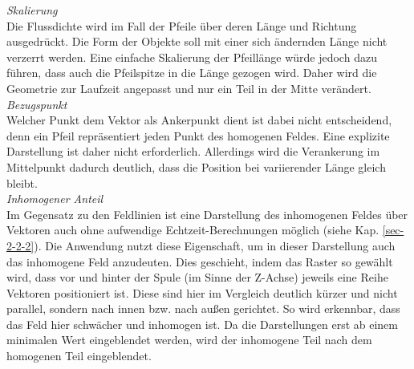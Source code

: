 \textit{Skalierung}\\
Die Flussdichte wird im Fall der Pfeile über deren Länge und Richtung ausgedrückt. Die Form der Objekte soll mit einer sich ändernden Länge nicht verzerrt werden. Eine einfache Skalierung der Pfeillänge würde jedoch dazu führen, dass auch die Pfeilspitze in die Länge gezogen wird. Daher wird die Geometrie zur Laufzeit angepasst und nur ein Teil in der Mitte verändert.\\

\textit{Bezugspunkt}\\
Welcher Punkt dem Vektor als Ankerpunkt dient ist dabei nicht entscheidend, denn ein Pfeil repräsentiert jeden Punkt des homogenen Feldes. Eine explizite Darstellung ist daher nicht erforderlich. Allerdings wird die Verankerung im Mittelpunkt dadurch deutlich, dass die Position bei variierender Länge gleich bleibt.\\

\textit{Inhomogener Anteil}\\
Im Gegensatz zu den Feldlinien ist eine Darstellung des inhomogenen Feldes über Vektoren auch ohne aufwendige Echtzeit-Berechnungen möglich (siehe Kap. \ref{sec-2-2-2}). Die Anwendung nutzt diese Eigenschaft, um in dieser Darstellung auch das inhomogene Feld anzudeuten. Dies geschieht, indem das Raster so gewählt wird, dass vor und hinter der Spule (im Sinne der Z-Achse) jeweils eine Reihe Vektoren positioniert ist. Diese sind hier im Vergleich deutlich kürzer und nicht parallel, sondern nach innen bzw. nach außen gerichtet. So wird erkennbar, dass das Feld hier schwächer und inhomogen ist. Da die Darstellungen erst ab einem minimalen Wert eingeblendet werden, wird der inhomogene Teil nach dem homogenen Teil eingeblendet.\\

